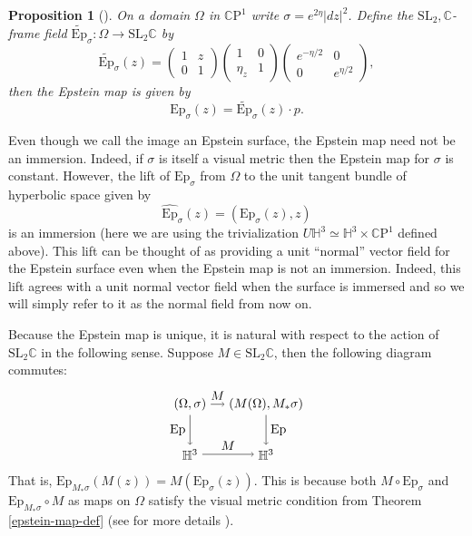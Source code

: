 \documentclass{amsart}
\newcommand{\C}{\mathbb{C}}
\newcommand{\CP}{\mathbb{C}\mathrm{P}}
\renewcommand{\H}{\mathbb{H}}
\newtheorem{prop}[thm]{Proposition}
\begin{document}
\begin{prop}[\cite{dumas2017}]
On a domain $\Omega$ in $\CP^1$ write $\sigma = e^{2\eta}|dz|^2$. Define the $\mathrm{SL}_2,\C$-frame field $\widetilde{\mathrm{Ep}}_\sigma: \Omega \to \mathrm{SL}_2\C$ by 
\[
\widetilde{\mathrm{Ep}}_\sigma(z) =
\begin{pmatrix}
1 & z \\
0 & 1
\end{pmatrix}
\begin{pmatrix}
1 & 0 \\
\eta_z & 1
\end{pmatrix}
\begin{pmatrix}
e^{-\eta/2} & 0 \\
0 & e^{\eta/2}
\end{pmatrix},
\]
then the Epstein map is given by 
\[
\mathrm{Ep}_\sigma(z) = \widetilde{\mathrm{Ep}}_\sigma(z) \cdot p.
\]
\end{prop}

 

Even though we call the image an Epstein surface, the Epstein map need not be an immersion. 
Indeed, if $\sigma$ is itself a visual metric then the Epstein map for $\sigma$ is constant. 
However, the lift of $\mathrm{Ep}_\sigma$ from $\Omega$ to the unit tangent bundle of hyperbolic space given by 
\[
\widehat{\mathrm{Ep}}_\sigma(z) = (\text{Ep}_\sigma(z),z) 
\] 
is an immersion (here we are using the trivialization $U\H^3 \simeq \H^3 \times \CP^1$ defined above). 
This lift can be thought of as providing a unit ``normal'' vector field for the Epstein surface even when the Epstein map is not an immersion. 
Indeed, this lift agrees with a unit normal vector field when the surface is immersed and so we will simply refer to it as the normal field from now on. 

Because the Epstein map is unique, it is natural with respect to the action of $\mathrm{SL}_2\C$ in the following sense. 
Suppose $M \in \mathrm{SL}_2\C$, then the following diagram commutes:
\[
\begin{tikzpicture}[scale=0.7]
\node (1) at (0,2) {$(\Omega,\sigma)$};
\node (2) at (3,2) {$(M(\Omega),M_*\sigma)$};
\node (3) at (0,0) {$\H^3$};
\node (4) at (3,0) {$\H^3$};


\draw[->] (1) to node [above] {$M$} (2);
\draw[->] (1) to node [left] {$\mathrm{Ep}$} (3);
\draw[->] (3) to node [above] {$M$} (4);
\draw[->] (2) to node [right] {$\mathrm{Ep}$} (4);

\end{tikzpicture}
\]
That is, $\mathrm{Ep}_{M_*\sigma}(M(z)) = M( \mathrm{Ep}_{\sigma}(z))$. 
This is because both $M \circ \mathrm{Ep}_\sigma$ and $\mathrm{Ep}_{M_*\sigma} \circ M$ as maps on $\Omega$ satisfy the visual metric condition from Theorem \ref{epstein-map-def} (see \cite{anderson1998} for more details ).
\end{document}

